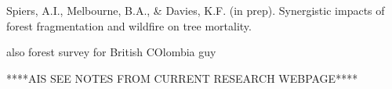 
%





Spiers, A.I., Melbourne, B.A., & Davies, K.F. (in prep). Synergistic impacts of forest fragmentation and wildfire on tree mortality.

also forest survey for British COlombia guy

****AIS SEE NOTES FROM CURRENT RESEARCH WEBPAGE****

